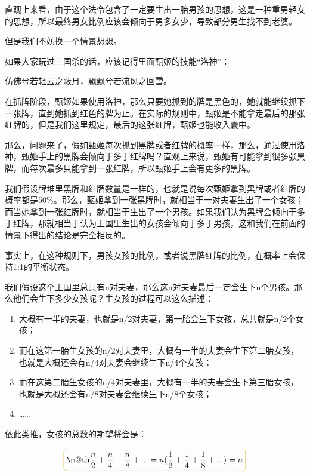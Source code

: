 \documentclass[12pt, letterpaper]{ctexrep}
\makeatletter
\newcommand*{\boxcolor}{Peru}
\renewcommand{\boxed}[1]{\textcolor{\boxcolor}{%
\tikz[baseline={([yshift=-1ex]current bounding box.center)}] \node [rectangle, minimum width=1ex,rounded corners,draw] {\normalcolor\m@th$\displaystyle#1$};}}
\newenvironment{shadedquotation}
 {\begin{shaded*}
  \quoting[leftmargin=5pt, rightmargin=5pt, vskip=0pt]
 }
 {\endquoting
 \end{shaded*}
}
\makeatother
\begin{document}
直观上来看，由于这个法令包含了一定要生出一胎男孩的思想，这是一种重男轻女的思想，所以最终男女比例应该会倾向于男多女少，导致部分男生找不到老婆。

但是我们不妨换一个情景想想。

如果大家玩过三国杀的话，应该记得里面甄姬的技能“洛神”：

\begin{shadedquotation}
\noindent
仿佛兮若轻云之蔽月，飘飘兮若流风之回雪。
\end{shadedquotation}


在抓牌阶段，甄姬如果使用洛神，那么只要她抓到的牌是黑色的，她就能继续抓下一张牌，直到她抓到红色的牌为止。在实际的规则中，甄姬是不能拿走最后的那张红牌的，但是我们这里规定，最后的这张红牌，甄姬也能收入囊中。

那么，问题来了，假如甄姬每次抓到黑牌或者红牌的概率一样，那么，通过使用洛神，甄姬手上的黑牌会倾向于多于红牌吗？直观上来说，甄姬有可能拿到很多张黑牌，而每次最多只能拿到一张红牌，所以甄姬手上会有更多的黑牌。

我们假设牌堆里黑牌和红牌数量是一样的，也就是说每次甄姬拿到黑牌或者红牌的概率都是50\%。那么，甄姬拿到一张黑牌时，就相当于一对夫妻生出了一个女孩；而当她拿到一张红牌时，就相当于生出了一个男孩。如果我们认为黑牌会倾向于多于红牌，那就相当于认为王国里生出的女孩会倾向于多于男孩，这和我们在前面的情景下得出的结论是完全相反的。

事实上，在这种规则下，男孩女孩的比例，或者说黑牌红牌的比例，在概率上会保持1:1的平衡状态。

我们假设这个王国里总共有n对夫妻，那么这n对夫妻最后一定会生下n个男孩。那么他们会生下多少女孩呢？生女孩的过程可以这么描述：

\begin{enumerate}
\item{ 大概有一半的夫妻，也就是n/2对夫妻，第一胎会生下女孩，总共就是n/2个女孩； }
\item{ 而在这第一胎生女孩的n/2对夫妻里，大概有一半的夫妻会生下第二胎女孩，也就是大概还会有n/4对夫妻会继续生下n/4个女孩； }
\item{ 而在这第二胎生女孩的n/4对夫妻里，大概有一半的夫妻会生下第三胎女孩，也就是大概还会有n/8对夫妻会继续生下n/8个女孩； }
\item{ …… }
\end{enumerate}


依此类推，女孩的总数的期望将会是：

$$\boxed{
\frac{n}{2} + \frac{n}{4} + \frac{n}{8} + ... = n (\frac{1}{2} + \frac{1}{4} + \frac{1}{8} + ...) = n
}$$
\end{document}
